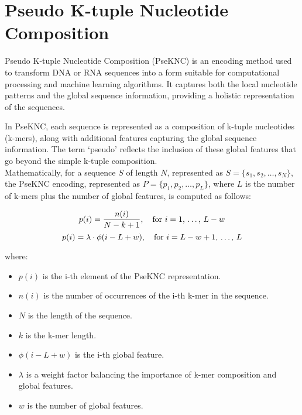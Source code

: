 \section{Pseudo K-tuple Nucleotide Composition}

Pseudo K-tuple Nucleotide Composition (PseKNC) is an encoding method used to 
transform DNA or RNA sequences into a form suitable for computational processing
 and machine learning algorithms. It captures both the local nucleotide patterns
  and the global sequence information, providing a holistic representation of the
   sequences.

In PseKNC, each sequence is represented as a composition of k-tuple nucleotides 
(k-mers), along with additional features capturing the global sequence information. 
The term `pseudo' reflects the inclusion of these global features that go beyond 
the simple k-tuple composition.\\

\noindent
Mathematically, for a sequence $S$ of length $N$, represented as 
$S = \{s_1, s_2, \ldots, s_N\}$, the PseKNC encoding, represented as 
$P = \{p_1, p_2, \ldots, p_L\}$, where $L$ is the number of k-mers plus the 
number of global features, is computed as follows:

\begin{equation}
  p(i) = \frac{n(i)}{N - k + 1}, \quad \text{for $i = 1$, \dots, $L - w$}
\end{equation}
\begin{equation}
p(i) = \lambda \cdot \phi(i - L + w), \quad \text{for $i = L - w + 1$, \dots, $L$}
\end{equation}

\noindent
where:
\begin{itemize}
  \item $p(i)$ is the i-th element of the PseKNC representation.
  \item $n(i)$ is the number of occurrences of the i-th k-mer in the sequence.
  \item $N$ is the length of the sequence.
  \item $k$ is the k-mer length.
  \item $\phi(i - L + w)$ is the i-th global feature.
  \item $\lambda$ is a weight factor balancing the importance of k-mer composition
  and global features.
  \item $w$ is the number of global features.
\end{itemize}

